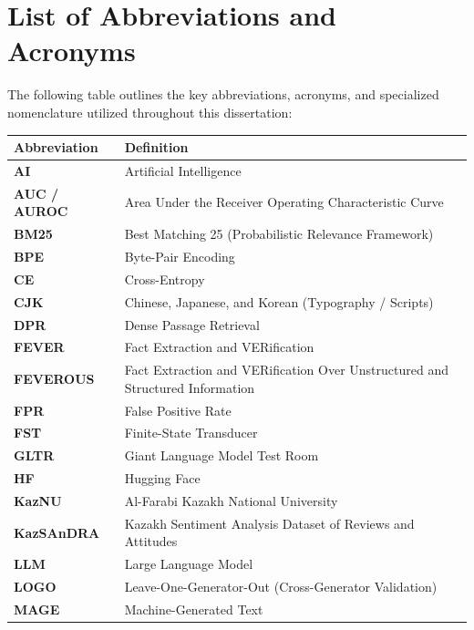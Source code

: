 \chapter*{List of Abbreviations and Acronyms}

\noindent The following table outlines the key abbreviations, acronyms, and specialized nomenclature utilized throughout this dissertation:

\vspace{0.8em}

\begin{center}
\small
\renewcommand{\arraystretch}{1.12}
\begin{tabular}{lp{11.5cm}}
\toprule
\textbf{Abbreviation} & \textbf{Definition} \\
\midrule
\textbf{AI}        & Artificial Intelligence \\
\textbf{AUC / AUROC} & Area Under the Receiver Operating Characteristic Curve \\
\textbf{BM25}      & Best Matching 25 (Probabilistic Relevance Framework) \\
\textbf{BPE}       & Byte-Pair Encoding \\
\textbf{CE}        & Cross-Entropy \\
\textbf{CJK}       & Chinese, Japanese, and Korean (Typography / Scripts) \\
\textbf{DPR}       & Dense Passage Retrieval \\
\textbf{FEVER}     & Fact Extraction and VERification \\
\textbf{FEVEROUS}  & Fact Extraction and VERification Over Unstructured and Structured Information \\
\textbf{FPR}       & False Positive Rate \\
\textbf{FST}       & Finite-State Transducer \\
\textbf{GLTR}      & Giant Language Model Test Room \\
\textbf{HF}        & Hugging Face \\
\textbf{KazNU}     & Al-Farabi Kazakh National University \\
\textbf{KazSAnDRA} & Kazakh Sentiment Analysis Dataset of Reviews and Attitudes \\
\textbf{LLM}       & Large Language Model \\
\textbf{LOGO}      & Leave-One-Generator-Out (Cross-Generator Validation) \\
\textbf{MAGE}      & Machine-Generated Text \\

\end{tabular}
\end{center}
